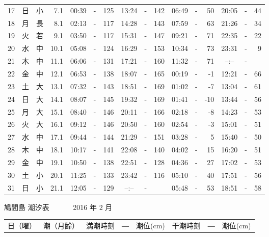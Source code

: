 \documentclass[12pt.a4j]{jsarticle}
\begin{document}
\begin{center}
\begin{table}[ht]
\begin{tabular}{|rc|cr|ccrccr|ccrccr|}
17 & 日 & 小 &  7.1 &  00:39 &-& 125  &  13:24 &-& 142  &   06:49 &-&  50  &   20:05 &-&  44  \\
18 & 月 & 長 &  8.1 &  02:13 &-& 117  &  14:28 &-& 143  &   07:59 &-&  63  &   21:26 &-&  34  \\
19 & 火 & 若 &  9.1 &  03:50 &-& 117  &  15:31 &-& 147  &   09:21 &-&  71  &   22:35 &-&  22  \\
20 & 水 & 中 & 10.1 &  05:08 &-& 124  &  16:29 &-& 153  &   10:34 &-&  73  &   23:31 &-&   9  \\
21 & 木 & 中 & 11.1 &  06:06 &-& 131  &  17:21 &-& 160  &   11:32 &-&  71  &   --:-- &-&     \\
22 & 金 & 中 & 12.1 &  06:53 &-& 138  &  18:07 &-& 165  &   00:19 &-&  -1  &   12:21 &-&  66  \\
23 & 土 & 大 & 13.1 &  07:32 &-& 143  &  18:51 &-& 169  &   01:02 &-&  -7  &   13:04 &-&  61  \\
24 & 日 & 大 & 14.1 &  08:07 &-& 145  &  19:32 &-& 169  &   01:41 &-& -10  &   13:44 &-&  56  \\
25 & 月 & 大 & 15.1 &  08:40 &-& 146  &  20:11 &-& 166  &   02:18 &-&  -8  &   14:23 &-&  53  \\
26 & 火 & 大 & 16.1 &  09:12 &-& 146  &  20:50 &-& 160  &   02:54 &-&  -3  &   15:01 &-&  51  \\
27 & 水 & 中 & 17.1 &  09:44 &-& 144  &  21:29 &-& 151  &   03:28 &-&   5  &   15:40 &-&  50  \\
28 & 木 & 中 & 18.1 &  10:17 &-& 141  &  22:08 &-& 140  &   04:02 &-&  15  &   16:20 &-&  51  \\
29 & 金 & 中 & 19.1 &  10:50 &-& 138  &  22:51 &-& 128  &   04:36 &-&  27  &   17:02 &-&  53  \\
30 & 土 & 小 & 20.1 &  11:25 &-& 133  &  23:42 &-& 116  &   05:10 &-&  40  &   17:51 &-&  56  \\
31 & 日 & 小 & 21.1 &  12:05 &-& 129  &  --:-- &-&     &   05:48 &-&  53  &   18:51 &-&  58  \\
   \hline
   \end{tabular}
\end{table}
\newpage
 {\LARGE 鳩間島  潮汐表　　　}
 {\large 2016 年  2 月}\\
 \begin{table}[ht]
    \begin{tabular}{|rc|cr|ccrccr|ccrccr|}
    \hline
    \multicolumn{2}{|c|}{日（曜）} & \multicolumn{2}{c|}{潮（月齢）} & \multicolumn{6}{c|}{満潮時刻　―　潮位(cm)} & \multicolumn{6}{c|}{干潮時刻　―　潮位(cm)} \\

\end{tabular}
\end{table}
\end{center}
\end{document}
